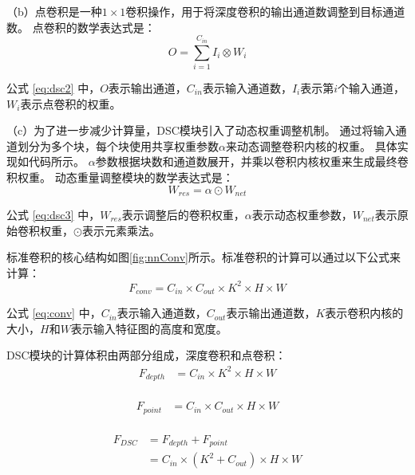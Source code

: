 （b）点卷积是一种$1\times1$卷积操作，用于将深度卷积的输出通道数调整到目标通道数。 点卷积的数学表达式是：
\begin{equation}
    \label{eq:dsc2}
    O = \sum\limits_{i=1}^{C_{in}}I_i\otimes{W_i}
\end{equation}

公式 \ref{eq:dsc2} 中，$O$表示输出通道，$C_{in}$表示输入通道数，$I_i$表示第$i$个输入通道，$W_i$表示点卷积的权重。

（c）为了进一步减少计算量，DSC模块引入了动态权重调整机制。 通过将输入通道划分为多个块，每个块使用共享权重参数$\alpha$来动态调整卷积内核的权重。 具体实现如代码所示。 $\alpha$参数根据块数和通道数展开，并乘以卷积内核权重来生成最终卷积权重。 动态重量调整模块的数学表达式是：
\begin{equation}
    \label{eq:dsc3}
    W_{res} = \alpha\odot{W_{net}}
\end{equation}

公式 \ref{eq:dsc3} 中，$W_{res}$表示调整后的卷积权重，$\alpha$表示动态权重参数，$W_{net}$表示原始卷积权重，$\odot$表示元素乘法。

标准卷积的核心结构如图\ref{fig:nnConv}所示。标准卷积的计算可以通过以下公式来计算：
\begin{equation}
    \label{eq:conv}
    F_{conv} = {C_{in}}\times{C_{out}}\times{K^2}\times{H}\times{W}
\end{equation}

公式 \ref{eq:conv} 中，$C_{in}$表示输入通道数，$C_{out}$表示输出通道数，$K$表示卷积内核的大小，$H$和$W$表示输入特征图的高度和宽度。 

DSC模块的计算体积由两部分组成，深度卷积和点卷积：
\begin{equation}
\begin{aligned}
    F_{depth} &= {C_{in}}\times{K^2}\times{H}\times{W} \\
\end{aligned} 
\label{eq:dsconv_depth}
\end{equation}

\begin{equation}
\begin{aligned}
    F_{point} &= {C_{in}}\times{C_{out}}\times{H}\times{W} \\
\end{aligned} 
\label{eq:dsconv_point}
\end{equation}

\begin{equation}
\begin{aligned}
    F_{DSC} &= F_{depth} + F_{point} \\
            &= {C_{in}}\times\left({K^2+C_{out}}\right)\times{H}\times{W}
\end{aligned} 
\label{eq:dsconv}
\end{equation}

